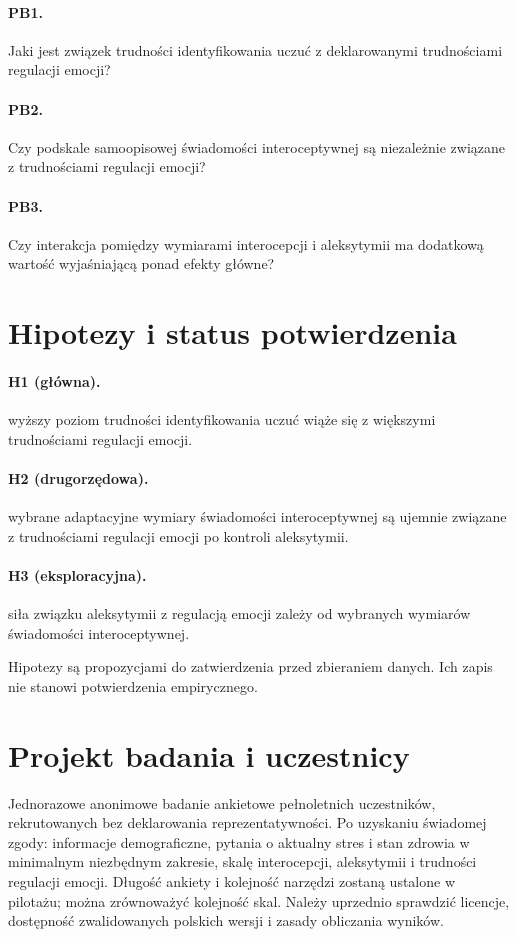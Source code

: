 \documentclass[11pt,a4paper]{article}
\begin{document}
\paragraph{PB1.} Jaki jest związek trudności identyfikowania uczuć z deklarowanymi trudnościami regulacji emocji?

\paragraph{PB2.} Czy podskale samoopisowej świadomości interoceptywnej są niezależnie związane z trudnościami regulacji emocji?

\paragraph{PB3.} Czy interakcja pomiędzy wymiarami interocepcji i aleksytymii ma dodatkową wartość wyjaśniającą ponad efekty główne?

\section{Hipotezy i status potwierdzenia}
\paragraph{H1 (główna).} wyższy poziom trudności identyfikowania uczuć wiąże się z większymi trudnościami regulacji emocji.

\paragraph{H2 (drugorzędowa).} wybrane adaptacyjne wymiary świadomości interoceptywnej są ujemnie związane z trudnościami regulacji emocji po kontroli aleksytymii.

\paragraph{H3 (eksploracyjna).} siła związku aleksytymii z regulacją emocji zależy od wybranych wymiarów świadomości interoceptywnej.

Hipotezy są propozycjami do zatwierdzenia przed zbieraniem danych. Ich zapis nie stanowi potwierdzenia empirycznego.
\section{Projekt badania i uczestnicy}
Jednorazowe anonimowe badanie ankietowe pełnoletnich uczestników, rekrutowanych bez deklarowania reprezentatywności. Po uzyskaniu świadomej zgody: informacje demograficzne, pytania o aktualny stres i stan zdrowia w minimalnym niezbędnym zakresie, skalę interocepcji, aleksytymii i trudności regulacji emocji. Długość ankiety i kolejność narzędzi zostaną ustalone w pilotażu; można zrównoważyć kolejność skal. Należy uprzednio sprawdzić licencje, dostępność zwalidowanych polskich wersji i zasady obliczania wyników.
\end{document}
